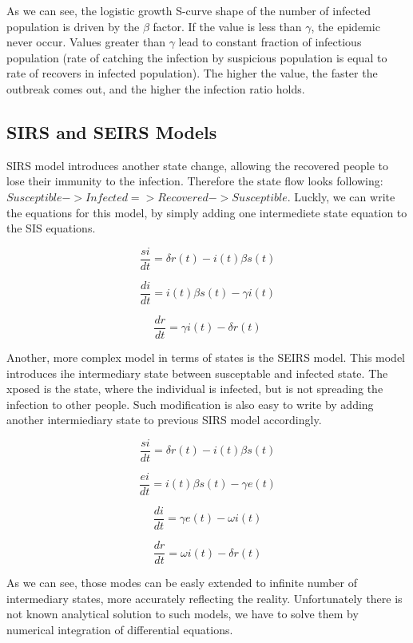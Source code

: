 \documentclass[nostrict]{szablonPG}
\begin{document}
As we can see, the logistic growth S-curve shape of the number of infected population is driven by the $\beta$ factor. If the value is less than $\gamma$, the epidemic never occur. Values greater than $\gamma$ lead to constant fraction of infectious population (rate of catching the infection by suspicious population is equal to rate of recovers in infected population). The higher the value, the faster the outbreak comes out, and the higher the infection ratio holds.

\subsection{SIRS and SEIRS Models}
SIRS model introduces another state change, allowing the recovered people to lose their immunity to the infection. Therefore the state flow looks following: $Susceptible -> Infected => Recovered -> Susceptible$. Luckly, we can write the equations for this model, by simply adding one intermediete state equation to the SIS equations.

\[\frac{si}{dt} = \delta r(t) - i(t) \beta s(t)\]

\[\frac{di}{dt} = i(t) \beta s(t) - \gamma i(t)\]

\[\frac{dr}{dt} = \gamma i(t) - \delta r(t)\]


Another, more complex model in terms of states is the SEIRS model. This model introduces ihe intermediary state between susceptable and infected state. The xposed is the state, where the individual is infected, but is not spreading the infection to other people. Such modification is also easy to write by adding another intermiediary state to previous SIRS model accordingly.

\[\frac{si}{dt} = \delta r(t) - i(t) \beta s(t)\]

\[\frac{ei}{dt} = i(t) \beta s(t) - \gamma e(t)\]

\[\frac{di}{dt} = \gamma e(t) - \omega i(t)\]

\[\frac{dr}{dt} = \omega i(t) - \delta r(t)\]

As we can see, those modes can be easly extended to infinite number of intermediary states, more accurately reflecting the reality. Unfortunately there is not known analytical solution to such models, we have to solve them by numerical integration of  differential equations.
\end{document}
